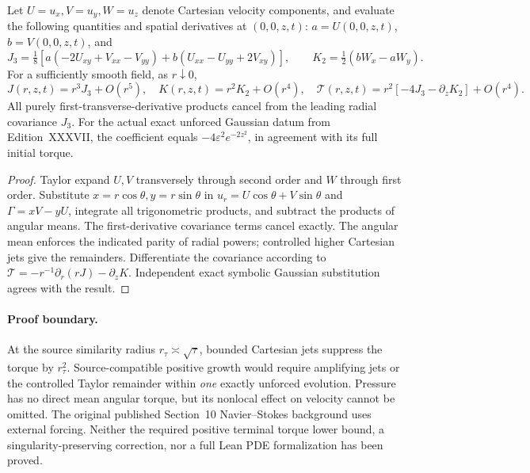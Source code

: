 \begin{proposition}
\label{prop:xli-axis-jet}
Let $U=u_x,V=u_y,W=u_z$ denote Cartesian
velocity components, and evaluate the following
quantities and spatial derivatives at $(0,0,z,t)$:
$a=U(0,0,z,t)$, $b=V(0,0,z,t)$, and
\[
J_3=\tfrac18[a(-2U_{xy}+V_{xx}-V_{yy})
+b(U_{xx}-U_{yy}+2V_{xy})],\qquad
K_2=\tfrac12(bW_x-aW_y).
\]
For a sufficiently smooth field, as $r\downarrow0$,
\begin{equation}\label{eq:xli-axis-jet}
\boxed{
J(r,z,t)=r^3J_3+O(r^5),\quad
K(r,z,t)=r^2K_2+O(r^4),\quad
\mathcal T(r,z,t)=r^2[-4J_3-\partial_zK_2]+O(r^4).
}
\end{equation}
All purely first-transverse-derivative products
cancel from the leading radial covariance $J_3$.
For the actual exact unforced Gaussian datum
from Edition~XXXVII, the coefficient equals
$-4\varepsilon^2e^{-2z^2}$, in agreement
with its full initial torque.
\end{proposition}
\begin{proof}
Taylor expand $U,V$ transversely through second
order and $W$ through first order.
Substitute $x=r\cos\theta,y=r\sin\theta$
in $u_r=U\cos\theta+V\sin\theta$ and
$\Gamma=xV-yU$, integrate all trigonometric
products, and subtract the products of angular
means. The first-derivative covariance terms
cancel exactly. The angular mean enforces
the indicated parity of radial powers;
controlled higher Cartesian jets give the
remainders. Differentiate the covariance
according to
$\mathcal T=-r^{-1}\partial_r(rJ)-\partial_zK$.
Independent exact symbolic Gaussian substitution
agrees with the result.
\end{proof}

\paragraph{Proof boundary.}
At the source similarity radius $r_\tau\asymp\sqrt\tau$,
bounded Cartesian jets suppress the torque by $r_\tau^2$.
Source-compatible positive growth would require
amplifying jets or the controlled Taylor remainder
within \emph{one} exactly unforced evolution.
Pressure has no direct mean angular torque, but
its nonlocal effect on velocity cannot be omitted.
The original published Section~10 Navier--Stokes
background uses external forcing. Neither
the required positive terminal torque lower bound,
a singularity-preserving correction, nor a full
Lean PDE formalization has been proved.
